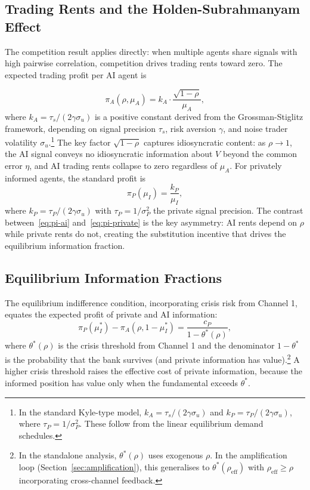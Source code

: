 \subsection{Trading Rents and the Holden-Subrahmanyam Effect}

The \citet{holden1992} competition result applies directly: when multiple agents share signals with high pairwise correlation, competition drives trading rents toward zero. The expected trading profit per AI agent is

\begin{equation}\label{eq:pi-ai}
  \pi_A(\rho, \mu_A) = k_A \cdot \frac{\sqrt{1-\rho}}{\mu_A},
\end{equation}
where $k_A = \tau_s/(2\gamma\sigma_u)$ is a positive constant derived from the Grossman-Stiglitz framework, depending on signal precision $\tau_s$, risk aversion $\gamma$, and noise trader volatility $\sigma_u$.\footnote{In the standard Kyle-type model, $k_A = \tau_s/(2\gamma\sigma_u)$ and $k_P = \tau_P/(2\gamma\sigma_u)$, where $\tau_P = 1/\sigma_P^2$. These follow from the linear equilibrium demand schedules.} The key factor $\sqrt{1-\rho}$ captures idiosyncratic content: as $\rho \to 1$, the AI signal conveys no idiosyncratic information about $V$ beyond the common error $\eta$, and AI trading rents collapse to zero regardless of $\mu_A$. For privately informed agents, the standard \citet{grossman1980} profit is
\begin{equation}\label{eq:pi-private}
  \pi_P(\mu_I) = \frac{k_P}{\mu_I},
\end{equation}
where $k_P = \tau_P/(2\gamma\sigma_u)$ with $\tau_P = 1/\sigma_P^2$ the private signal precision. The contrast between~\eqref{eq:pi-ai} and~\eqref{eq:pi-private} is the key asymmetry: AI rents depend on $\rho$ while private rents do not, creating the substitution incentive that drives the equilibrium information fraction.

\subsection{Equilibrium Information Fractions}

The equilibrium indifference condition, incorporating crisis risk from Channel 1, equates the expected profit of private and AI information:
\begin{equation}\label{eq:gs-indifference}
  \pi_P(\mu_I^*) - \pi_A(\rho, 1-\mu_I^*) = \frac{c_P}{1 - \theta^*(\rho)},
\end{equation}
where $\theta^*(\rho)$ is the crisis threshold from Channel 1 and the denominator $1 - \theta^*$ is the probability that the bank survives (and private information has value).\footnote{In the standalone analysis, $\theta^*(\rho)$ uses exogenous $\rho$. In the amplification loop (Section~\ref{sec:amplification}), this generalises to $\theta^*(\rho_{\text{eff}})$ with $\rho_{\text{eff}} \geq \rho$ incorporating cross-channel feedback.} A higher crisis threshold raises the effective cost of private information, because the informed position has value only when the fundamental exceeds $\theta^*$.

